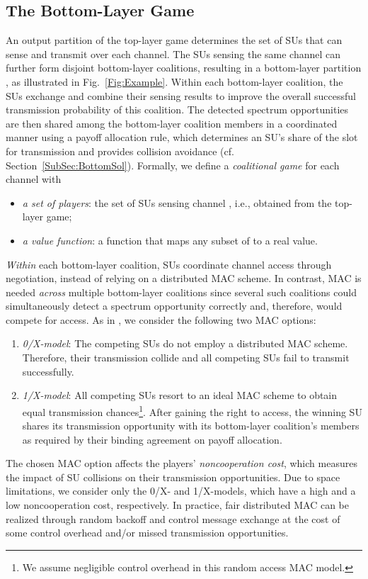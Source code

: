 \documentclass[journal,draftclsnofoot,onecolumn]{IEEEtran}
\theoremstyle{definition}
\begin{document}
\subsection{The Bottom-Layer Game}\label{SubSec:BottomDef}
An output partition  of the top-layer game determines the set of SUs that can sense and transmit over each channel. The SUs sensing the same channel  can further form disjoint bottom-layer coalitions, resulting in a bottom-layer partition , as illustrated in Fig.~\ref{Fig:Example}. Within each bottom-layer coalition, the SUs exchange and combine their sensing results to improve the overall successful transmission probability of this coalition. The detected spectrum opportunities are then shared among the bottom-layer coalition members in a coordinated manner using a payoff allocation rule, which determines an SU's share of the slot for transmission and provides collision avoidance (cf. Section~\ref{SubSec:BottomSol}). Formally, we define a \emph{coalitional game}  \cite{CoalGameSurvey} for each channel  with
\begin{itemize}
	\item  \emph{a set of players}: the set of SUs  sensing channel , i.e.,  obtained from the top-layer game;
  \item  \emph{a value function}: a function  that maps any subset of  to a real value.
\end{itemize}

\emph{Within }each bottom-layer coalition, SUs coordinate channel access through negotiation, instead of relying on a distributed MAC scheme. In contrast, MAC is needed \emph{across} multiple bottom-layer coalitions since several such coalitions could simultaneously detect a spectrum opportunity correctly and, therefore, would compete for access. As in \cite{QZhaoTDFS}, we consider the following two MAC options:

\begin{enumerate}
  \item \emph{0/X-model}: The competing SUs do not employ a distributed MAC scheme. Therefore, their transmission collide and all competing SUs fail to transmit successfully.
  \item \emph{1/X-model}: All competing SUs resort to an ideal MAC scheme to obtain equal transmission chances\footnote{We assume negligible control overhead in this random access MAC model.}. After gaining the right to access, the winning SU shares its transmission opportunity with its bottom-layer coalition's members as required by their binding agreement on payoff allocation.
\end{enumerate}
The chosen MAC option affects the players' \emph{noncooperation cost}, which measures the impact of SU collisions on their transmission opportunities. Due to space limitations, we consider only the 0/X- and 1/X-models, which have a high and a low noncooperation cost, respectively. In practice, fair distributed MAC can be realized through random backoff and control message exchange at the cost of some control overhead and/or missed transmission opportunities.
\end{document}
